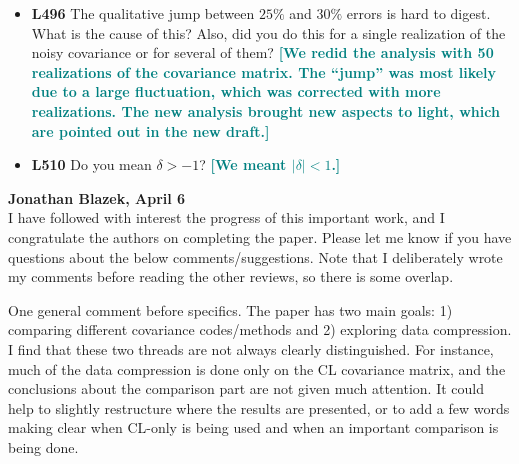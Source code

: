 \documentclass{article}
\newcommand\reply[1]{{\bf {\textcolor{teal}{[#1]}}}}
\begin{document}
\begin{itemize}
		\item \textbf{L496} The qualitative jump between $25\%$ and $30\%$ errors is hard to digest. What is the cause of this? Also, did you do this for a single realization of the noisy covariance or for several of them? \reply{We redid the analysis with 50 realizations of the covariance matrix. The “jump” was most likely due to a large fluctuation, which was corrected with more realizations. The new analysis brought new aspects to light, which are pointed out in the new draft.}
		\item \textbf{L510} Do you mean $\delta > -1$? \reply{We meant $|\delta| < 1$.} \\
	\end{itemize}
	
	
	\textbf{Jonathan Blazek, April 6} \\
	
	I have followed with interest the progress of this important work, and I congratulate the authors on completing the paper. Please let me know if you have questions about the below comments/suggestions. Note that I deliberately wrote my comments before reading the other reviews, so there is some overlap.
	
	One general comment before specifics. The paper has two main goals: 1) comparing different covariance codes/methods and 2) exploring data compression. I find that these two threads are not always clearly distinguished. For instance, much of the data compression is done only on the CL covariance matrix, and the conclusions about the comparison part are not given much attention. It could help to slightly restructure where the results are presented, or to add a few words making clear when CL-only is being used and when an important comparison is being done.
	
\end{document}

